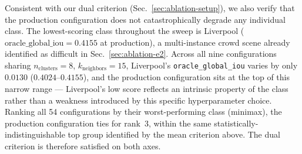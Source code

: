 Consistent with our dual criterion (Sec.~\ref{sec:ablation-setup}), we also
verify that the production configuration does not catastrophically degrade
any individual class. The lowest-scoring class throughout the sweep is
Liverpool ($\text{oracle\_global\_iou}=0.4155$ at production), a
multi-instance crowd scene already identified as difficult in
Sec.~\ref{sec:ablation-e2}. Across all nine configurations sharing
$n_{\text{clusters}}=8$, $k_{\text{neighbors}}=15$, Liverpool's
\texttt{oracle\_global\_iou} varies by only $0.0130$ ($0.4024$--$0.4155$),
and the production configuration sits at the top of this narrow range ---
Liverpool's low score reflects an intrinsic property of the class rather
than a weakness introduced by this specific hyperparameter choice. Ranking
all 54 configurations by their worst-performing class (minimax), the
production configuration ties for rank~3, within the same
statistically-indistinguishable top group identified by the mean criterion
above. The dual criterion is therefore satisfied on both axes.

%
%

%
%

